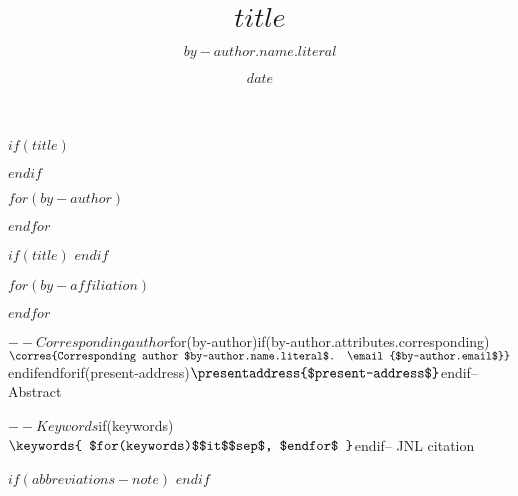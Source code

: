 $if(title)$
\title{$title$}
$endif$
\date{$date$}

$for(by-author)$
\author[$for(by-author.affiliations)$$it.number$$sep$,$endfor$]{$by-author.name.literal$}
$endfor$

$if(title)$
$endif$

$for(by-affiliation)$
\address[$it.number$]{
  ,
  ,
  }
$endfor$

$-- Corresponding author
$for(by-author)$
$if(by-author.attributes.corresponding)$\corres{Corresponding author $by-author.name.literal$. \email{$by-author.email$}}$endif$
$endfor$

$if(present-address)$
\presentaddress{$present-address$}
$endif$

$-- Abstract

$-- Keywords
$if(keywords)$
\keywords{
  $for(keywords)$$it$$sep$, $endfor$
}
$endif$

$-- JNL citation

$if(abbreviations-note)$
\renewcommand\thefootnote{}
\renewcommand\thefootnote{\fnsymbol{footnote}}
\setcounter{footnote}{1}
$endif$